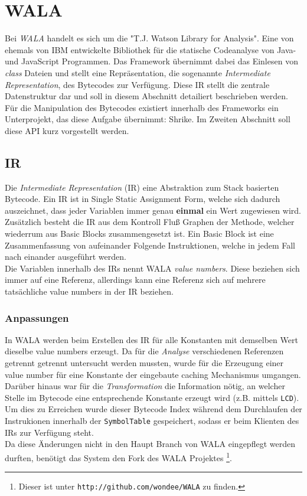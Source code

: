 \section{WALA}

Bei \textit{WALA} handelt es sich um die "T.J. Watson Library for Analysis". Eine von ehemals von IBM 
entwickelte Bibliothek für die statische Codeanalyse von Java- und JavaScript Programmen. Das Framework 
übernimmt dabei das Einlesen von \textit{class} Dateien und stellt eine Repräsentation, die sogenannte 
\textit{Intermediate Representation}, des Bytecodes zur Verfügung. Diese IR stellt die zentrale 
Datenstruktur dar und soll in diesem Abschnitt detailiert beschrieben werden.
\\
Für die Manipulation des Bytecodes existiert innerhalb des Frameworks ein Unterprojekt, das diese Aufgabe 
übernimmt: Shrike. Im Zweiten Abschnitt soll diese API kurz vorgestellt werden.  

\subsection{IR}

Die \textit{Intermediate Representation} (IR) eine Abstraktion zum Stack basierten Bytecode. Ein IR ist
in Single Static Assignment Form, welche sich dadurch auszeichnet, dass jeder Variablen immer genau 
\textbf{einmal} ein Wert zugewiesen wird. Zusätzlich besteht die IR aus dem Kontroll Fluß Graphen der 
Methode, welcher wiederrum aus Basic Blocks zusammengesetzt ist. Ein Basic Block ist eine Zusammenfassung 
von aufeinander Folgende Instruktionen, welche in jedem Fall nach einander ausgeführt werden.
\\
Die Variablen innerhalb des IRs nennt WALA \textit{value numbers}. Diese beziehen sich immer auf eine 
Referenz, allerdings kann eine Referenz sich auf mehrere tatsächliche value numbers in der IR beziehen.
\\

\subsubsection{Anpassungen}

In WALA werden beim Erstellen des IR für alle Konstanten mit demselben Wert dieselbe value numbers erzeugt. 
Da für die \textit{Analyse} verschiedenen Referenzen getrennt getrennt untersucht werden mussten, wurde 
für die Erzeugung einer value number für eine Konstante der eingebaute caching Mechanismus umgangen. 
\\
Darüber hinaus war für die \textit{Transformation} die Information nötig, an welcher Stelle im Bytecode eine
entsprechende Konstante erzeugt wird (z.B. mittels \texttt{LCD}). Um dies zu Erreichen wurde dieser Bytecode 
Index während dem Durchlaufen der Instrukionen innerhalb der \texttt{SymbolTable} gespeichert, sodass er 
beim Klienten des IRs zur Verfügung steht.
\\
Da diese Änderungen nicht in den Haupt Branch von WALA eingepflegt werden durften, benötigt das System den 
Fork des WALA Projektes \footnote{Dieser ist unter \texttt{http://github.com/wondee/WALA} zu finden.}.


